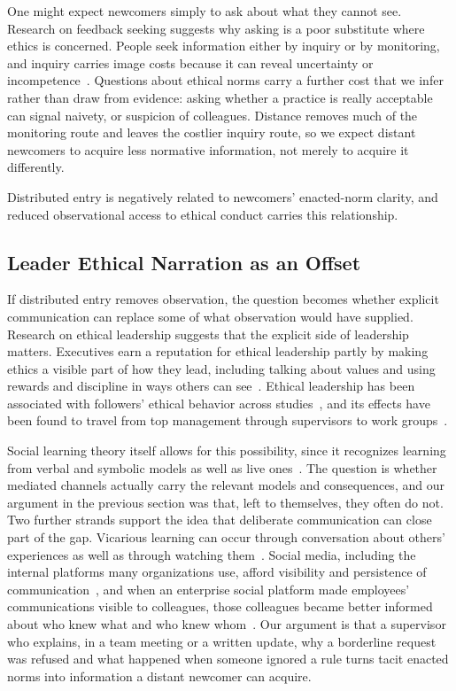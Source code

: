 One might expect newcomers simply to ask about what they cannot see. Research on feedback seeking suggests why asking is a poor substitute where ethics is concerned. People seek information either by inquiry or by monitoring, and inquiry carries image costs because it can reveal uncertainty or incompetence~\citep{ashford2003reflections}. Questions about ethical norms carry a further cost that we infer rather than draw from evidence: asking whether a practice is really acceptable can signal naivety, or suspicion of colleagues. Distance removes much of the monitoring route and leaves the costlier inquiry route, so we expect distant newcomers to acquire less normative information, not merely to acquire it differently.

\begin{proposition}
Distributed entry is negatively related to newcomers' enacted-norm clarity, and reduced observational access to ethical conduct carries this relationship.
\end{proposition}

\subsection{Leader Ethical Narration as an Offset}

If distributed entry removes observation, the question becomes whether explicit communication can replace some of what observation would have supplied. Research on ethical leadership suggests that the explicit side of leadership matters. Executives earn a reputation for ethical leadership partly by making ethics a visible part of how they lead, including talking about values and using rewards and discipline in ways others can see~\citep{trevino2000moral}. Ethical leadership has been associated with followers' ethical behavior across studies~\citep{bedi2016meta}, and its effects have been found to travel from top management through supervisors to work groups~\citep{mayer2009how}.

Social learning theory itself allows for this possibility, since it recognizes learning from verbal and symbolic models as well as live ones~\citep{bandura1977social}. The question is whether mediated channels actually carry the relevant models and consequences, and our argument in the previous section was that, left to themselves, they often do not. Two further strands support the idea that deliberate communication can close part of the gap. Vicarious learning can occur through conversation about others' experiences as well as through watching them~\citep{myers2018coactive}. Social media, including the internal platforms many organizations use, afford visibility and persistence of communication~\citep{treem2013social}, and when an enterprise social platform made employees' communications visible to colleagues, those colleagues became better informed about who knew what and who knew whom~\citep{leonardi2015ambient}. Our argument is that a supervisor who explains, in a team meeting or a written update, why a borderline request was refused and what happened when someone ignored a rule turns tacit enacted norms into information a distant newcomer can acquire.

